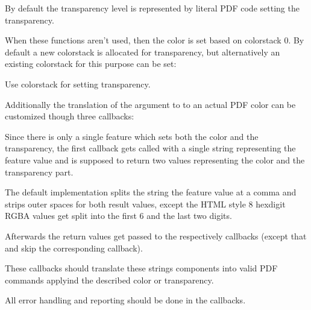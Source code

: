             By default the transparency level is represented by literal PDF code setting the
            transparency.
  \endaltitem

\endfunctionlist

When these functions aren't used, then the color is set based on colorstack 0.
By default a new colorstack is allocated for transparency, but alternatively an
existing colorstack for this purpose can be set:

\beginfunctionlist

            Use colorstack  for setting transparency.
  \endaltitem

\endfunctionlist

\endsubsubsection


Additionally the translation of the argument to  to an
actual PDF color can be customized though three  callbacks:

Since there is only a single  feature which sets both the
color and the transparency, the first callback
 gets called with a single string representing
the feature value and is supposed to return two values representing the color
and the transparency part.

The default implementation splits the string the feature value at a comma and
strips outer spaces for both result values, except the HTML style 8 hexdigit
RGBA values get split into the first 6 and the last two digits.

Afterwards the return values get passed to the
 respectively
 callbacks (except that 
and  skip the corresponding callback).

These callbacks should translate these strings components into valid PDF
commands applyind the described color or transparency.

All error handling and reporting should be done in the callbacks.

\endsubsubsection

\endsubsection
\endsection


